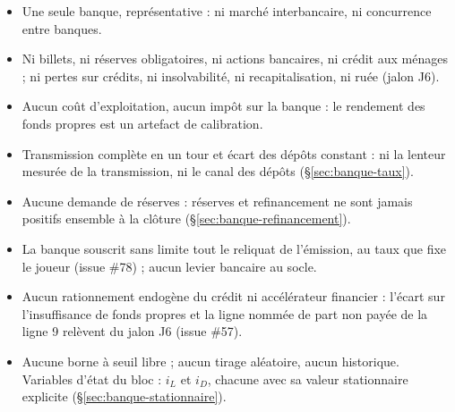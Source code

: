 \documentclass[11pt,a4paper]{article}
\begin{document}
\begin{portee}
\begin{itemize}
\item Une seule banque, représentative : ni marché interbancaire, ni concurrence entre banques.
\item Ni billets, ni réserves obligatoires, ni actions bancaires, ni crédit aux ménages ; ni pertes sur crédits, ni insolvabilité, ni recapitalisation, ni ruée (jalon J6).
\item Aucun coût d'exploitation, aucun impôt sur la banque : le rendement des fonds propres est un artefact de calibration.
\item Transmission complète en un tour et écart des dépôts constant : ni la lenteur mesurée de la transmission, ni le canal des dépôts (\S\ref{sec:banque-taux}).
\item Aucune demande de réserves : réserves et refinancement ne sont jamais positifs ensemble à la clôture (\S\ref{sec:banque-refinancement}).
\item La banque souscrit sans limite tout le reliquat de l'émission, au taux que fixe le joueur (issue \#78) ; aucun levier bancaire au socle.
\item Aucun rationnement endogène du crédit ni accélérateur financier : l'écart sur l'insuffisance de fonds propres et la ligne nommée de part non payée de la ligne 9 relèvent du jalon J6 (issue \#57).
\item Aucune borne à seuil libre ; aucun tirage aléatoire, aucun historique. Variables d'état du bloc : $i_L$ et $i_D$, chacune avec sa valeur stationnaire explicite (\S\ref{sec:banque-stationnaire}).
\end{itemize}
\end{portee}

\end{document}
